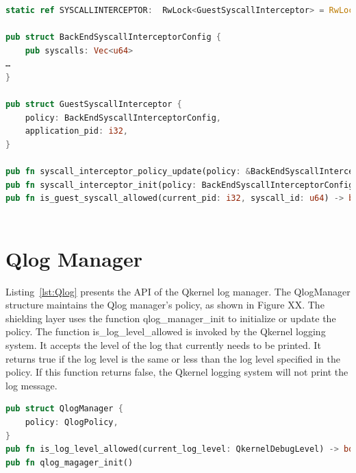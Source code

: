 \begin{lstlisting}[language=rust, caption= API of system call interceptor, label={lst:Interceptor}]
static ref SYSCALLINTERCEPTOR:  RwLock<GuestSyscallInterceptor> = RwLock::new(GuestSyscallInterceptor::default());

pub struct BackEndSyscallInterceptorConfig {
    pub syscalls: Vec<u64>
…
}

pub struct GuestSyscallInterceptor {
    policy: BackEndSyscallInterceptorConfig,
    application_pid: i32,
}

pub fn syscall_interceptor_policy_update(policy: &BackEndSyscallInterceptorConfig) -> Result<()> 
pub fn syscall_interceptor_init(policy: BackEndSyscallInterceptorConfig) -> Result<()> 
pub fn is_guest_syscall_allowed(current_pid: i32, syscall_id: u64) -> bool
    
\end{lstlisting}


\section{Qlog Manager}

Listing~\ref{lst:Qlog} presents the API of the Qkernel log manager. The QlogManager structure maintains the Qlog manager's policy, as shown in Figure XX. The shielding layer uses the function  qlog\_manager\_init to initialize or update the policy. The function is\_log\_level\_allowed  is invoked by 
the Qkernel logging system. It accepts the level of the log that currently needs to be printed. It returns true if the log level is the same or less than the log level specified in the policy. If this function returns false, the Qkernel logging system will not print the log message.

\begin{lstlisting}[language=rust, caption= API of Qlog manager, label={lst:Qlog}]
pub struct QlogManager {
    policy: QlogPolicy,
}
pub fn is_log_level_allowed(current_log_level: QkernelDebugLevel) -> bool
pub fn qlog_magager_init()   
\end{lstlisting}



\cleardoublepage




